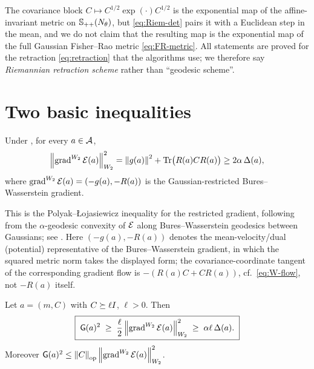 \begin{remark}
\label{rem:not-geodesic}
The covariance block $C\mapsto C^{1/2}\exp(\cdot)C^{1/2}$ is the exponential map of the
affine-invariant metric on $\mathbb{S}_{++}(N_\theta)$, but \eqref{eq:Riem-det} pairs it with a Euclidean
step in the mean, and we do not claim that the resulting map is the exponential map of the full
Gaussian Fisher--Rao metric \eqref{eq:FR-metric}. All statements are proved for the retraction
\eqref{eq:retraction} that the algorithms use; we therefore say \emph{Riemannian retraction
scheme} rather than ``geodesic scheme''.
\end{remark}

\section{Two basic inequalities}
\label{sec:basic}

\begin{lemma}
\label{lem:W2-PL}
Under , for every $a\in\mathcal{A}$,
\[
    \left\lVert \operatorname{grad}^{W_2}\mathcal{E}(a)\right\rVert_{W_2}^2
    =\left\lVert g(a)\right\rVert^2+\operatorname{Tr}\bigl(R(a)CR(a)\bigr)
    \geq2\alpha\,\Delta(a),
\]
where $\operatorname{grad}^{W_2}\mathcal{E}(a)=(-g(a),-R(a))$ is the Gaussian-restricted Bures--Wasserstein gradient.
\end{lemma}

This is the Polyak--{\L}ojasiewicz inequality for the restricted gradient, following from the
$\alpha$-geodesic convexity of $\mathcal{E}$ along Bures--Wasserstein geodesics between Gaussians; see
\citet{lambert2022variational,diao2023forward}. Here $(-g(a),-R(a))$ denotes the mean-velocity/dual
(potential) representative of the Bures--Wasserstein gradient, in which the squared metric norm takes
the displayed form; the covariance-coordinate tangent of the corresponding gradient flow is
$-(R(a)C+CR(a))$, cf.\ \eqref{eq:W-flow}, not $-R(a)$ itself.

\begin{lemma}
\label{lem:FR-W2}
Let $a=(m,C)$ with $C\succeq\ell I$, $\ell>0$. Then
\begin{equation}
\label{eq:FR-W2}
    \boxed{\;
    \mathsf{G}(a)^2
    \;\geq\;
    \frac{\ell}{2}\left\lVert \operatorname{grad}^{W_2}\mathcal{E}(a)\right\rVert_{W_2}^2
    \;\geq\;
    \alpha\ell\,\Delta(a).
    \;}
\end{equation}
Moreover $\mathsf{G}(a)^2\leq\left\lVert C\right\rVert_{\mathrm{op}}\left\lVert \operatorname{grad}^{W_2}\mathcal{E}(a)\right\rVert_{W_2}^2$.
\end{lemma}

